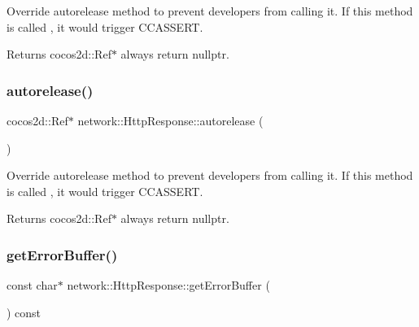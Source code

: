 Override autorelease method to prevent developers from calling it. If this method is called , it would trigger C\+C\+A\+S\+S\+E\+RT. \begin{DoxyReturn}{Returns}
cocos2d\+::\+Ref$\ast$ always return nullptr. 
\end{DoxyReturn}
\mbox{\label{classnetwork_1_1HttpResponse_a1b2e5c8062533484d3cbf5ca26b91f8f}} 
\subsubsection{\texorpdfstring{autorelease()}{autorelease()}\hspace{0.1cm}{\footnotesize\ttfamily [2/2]}}
{\footnotesize\ttfamily cocos2d\+::\+Ref$\ast$ network\+::\+Http\+Response\+::autorelease (\begin{DoxyParamCaption}{ }\end{DoxyParamCaption})\hspace{0.3cm}{\ttfamily [inline]}}

Override autorelease method to prevent developers from calling it. If this method is called , it would trigger C\+C\+A\+S\+S\+E\+RT. \begin{DoxyReturn}{Returns}
cocos2d\+::\+Ref$\ast$ always return nullptr. 
\end{DoxyReturn}
\mbox{\label{classnetwork_1_1HttpResponse_a93f2be80baf4a6f82e7e7e0bf3399b43}} 
\subsubsection{\texorpdfstring{get\+Error\+Buffer()}{getErrorBuffer()}\hspace{0.1cm}{\footnotesize\ttfamily [1/2]}}
{\footnotesize\ttfamily const char$\ast$ network\+::\+Http\+Response\+::get\+Error\+Buffer (\begin{DoxyParamCaption}{ }\end{DoxyParamCaption}) const\hspace{0.3cm}{\ttfamily [inline]}}

